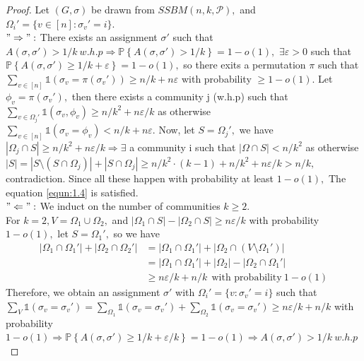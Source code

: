 \begin{proof}
    Let $(G, \sigma)$ be drawn from $SSBM(n, k, \mathcal{P}),$ and $\Omega_i' = \{ v\in [n] : \sigma_v' = i \}.$ \vspace{1mm}\\
    $"\Rightarrow":$ There exists an assignment $\sigma'$ such that $A(\sigma, \sigma')>1/k~w.h.p \Rightarrow \mathbb{P}\left\{A(\sigma, \sigma')>1/k\right\}=1-o(1),$ $\exists\varepsilon>0$ such that $\mathbb{P}\left\{A(\sigma, \sigma')\geq1/k+\varepsilon\right\}=1-o(1),$ so there exits a permutation $\pi$ such that $\sum_{v\in[n]}\mathbb{1}(\sigma_v=\pi(\sigma_v'))\geq n/k + n\varepsilon$ with probability $\geq 1-o(1)$. Let $\phi_v=\pi(\sigma_v'),$ then there exists a community j (w.h.p) such that $\sum_{v\in \Omega_j'}\mathbb{1}(\sigma_v, \phi_v)\geq n/k^2 +n\varepsilon/k$ as otherwise $\sum_{v\in[n]}\mathbb{1}(\sigma_v=\phi_v)< n/k + n\varepsilon.$ Now, let $S=\Omega_j',$ we have $|\Omega_j\cap S|\geq n/k^2 +n\varepsilon/k \Rightarrow \exists$ a community i such that $|\Omega\cap S|<n/k^2$ as otherwise $|S|=|S\setminus(S\cap\Omega_j)|+|S\cap\Omega_j|\geq n/k^2\cdot(k-1)+n/k^2 +n\varepsilon/k>n/k,$ contradiction. Since all these happen with probability at least $1-o(1),$ The equation \ref{equn:1.4} is satisfied.
    \vspace{3mm}\\
    $"\Leftarrow":$ We induct on the number of communities $k\geq 2$.\\
    For $k=2, V=\Omega_1\cup\Omega_2,$ and $|\Omega_1\cap S|-|\Omega_2\cap S|\geq n\varepsilon/k$ with probability $1-o(1),$ let $S=\Omega_1',$ so we have \begin{align*} |\Omega_1\cap\Omega_1'|+|\Omega_2\cap\Omega_2'|&=|\Omega_1\cap\Omega_1'|+|\Omega_2\cap(V\setminus\Omega_1')|\\
    &=|\Omega_1\cap\Omega_1'|+|\Omega_2|-|\Omega_2\cap\Omega_1'|\\
    &\geq n\varepsilon/k+n/k~~\text{with probability}~1-o(1)
    \end{align*}
    Therefore, we obtain an assignment $\sigma'$ with $\Omega_i'=\{v: \sigma_v'=i\}$ such that $\sum_V\mathbb{1}(\sigma_v=\sigma_v')=\sum_{\Omega_1}\mathbb{1}(\sigma_v=\sigma_v')+\sum_{\Omega_2}\mathbb{1}(\sigma_v=\sigma_v')\geq n\varepsilon/k+n/k$ with probability $1-o(1)\Rightarrow \mathbb{P}\left\{A(\sigma, \sigma')\geq1/k+\varepsilon/k\right\}=1-o(1)\Rightarrow A(\sigma, \sigma')>1/k~w.h.p$\\

\end{proof}
